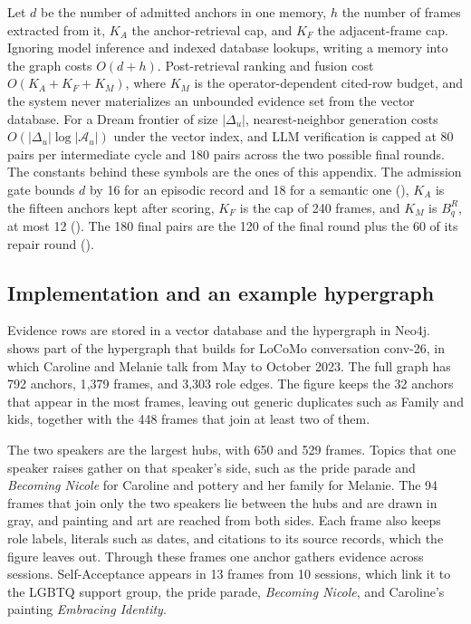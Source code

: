 Let \(d\) be the number of admitted anchors in one memory, \(h\) the number of
frames extracted from it, \(K_A\) the anchor-retrieval cap, and \(K_F\) the
adjacent-frame cap. Ignoring model inference and indexed database lookups,
writing a memory into the graph costs \(O(d+h)\). Post-retrieval ranking and
fusion cost \(O(K_A+K_F+K_M)\), where \(K_M\) is the operator-dependent cited-row
budget, and the system never materializes an unbounded evidence set from the vector database.
For a Dream frontier of size \(|\Delta_u|\), nearest-neighbor generation costs
\(O(|\Delta_u|\log|\mathcal A_u|)\) under the vector index, and LLM verification
is capped at 80 pairs per intermediate cycle and 180 pairs across the two
possible final rounds. The constants behind these symbols are the ones of this
appendix. The admission gate bounds \(d\) by 16 for an episodic record and 18
for a semantic one (), \(K_A\) is the fifteen anchors kept after scoring, \(K_F\) is the cap of 240 frames, and \(K_M\) is \(B_q^R\), at most 12
(). The 180 final pairs are the 120 of the final
round plus the 60 of its repair round ().

\subsection{Implementation and an example hypergraph}
\label{app:method-implementation}

Evidence rows are stored in a vector database and the hypergraph in Neo4j.
 shows part of the hypergraph that \ours builds for
LoCoMo conversation conv-26, in which Caroline and Melanie talk from May to
October 2023. The full graph has 792 anchors, 1{,}379 frames, and 3{,}303 role
edges. The figure keeps the 32 anchors that appear in the most frames, leaving
out generic duplicates such as Family and kids, together with the 448 frames
that join at least two of them.

The two speakers are the largest hubs, with 650 and 529 frames. Topics that
one speaker raises gather on that speaker's side, such as the pride parade and
\emph{Becoming Nicole} for Caroline and pottery and her family for Melanie. The
94 frames that join only the two speakers lie between the hubs and are drawn in
gray, and painting and art are reached from both sides. Each frame also keeps role labels,
literals such as dates, and citations to its source records, which the figure
leaves out. Through these frames one anchor gathers evidence across sessions.
Self-Acceptance appears in 13 frames from 10 sessions, which link it to the
LGBTQ support group, the pride parade, \emph{Becoming Nicole}, and Caroline's
painting \emph{Embracing Identity}.

